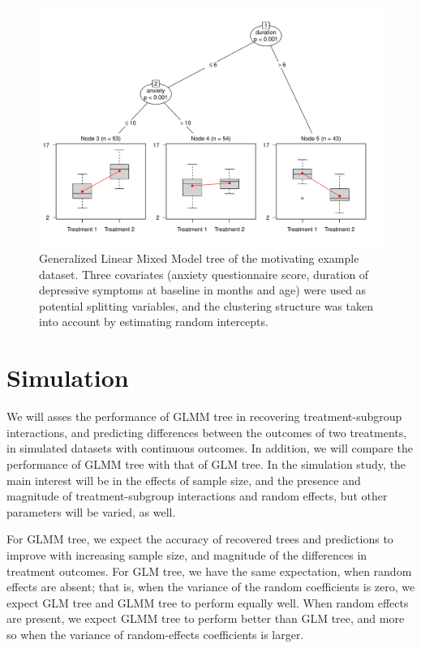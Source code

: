 \documentclass[nobf,doc]{apa}
\begin{document}
\begin{figure}[!h]
    \includegraphics[width=12cm]{glimmertree_example.pdf}
    \caption{Generalized Linear Mixed Model tree of the motivating example dataset. Three covariates (anxiety questionnaire score, duration of depressive symptoms at baseline in months and age) were used as potential splitting variables, and the clustering structure was taken into account by estimating random intercepts.}
    \label{fig:example_glimmertree}
\end{figure}


\section{Simulation}

We will asses the performance of GLMM tree in recovering treatment-subgroup interactions, and predicting differences between the outcomes of two treatments, in simulated datasets with continuous outcomes. In addition, we will compare the performance of GLMM tree with that of GLM tree. In the simulation study, the main interest will be in the effects of sample size, and the presence and magnitude of treatment-subgroup interactions and random effects, but other parameters will be varied, as well. 

For GLMM tree, we expect the accuracy of recovered trees and predictions to improve with increasing sample size, and magnitude of the differences in treatment outcomes. For GLM tree, we have the same expectation, when random effects are absent; that is, when the variance of the random coefficients is zero, we expect GLM tree and GLMM tree to perform equally well. When random effects are present, we expect GLMM tree to perform better than GLM tree, and more so when the variance of random-effects coefficients is larger.
\end{document}
